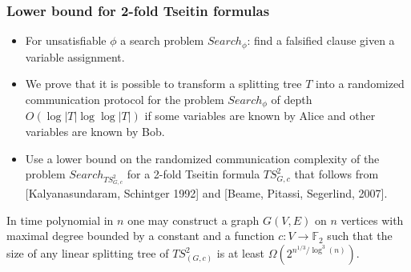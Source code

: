 \begin{frame}
    \frametitle{Lower bound for 2-fold Tseitin formulas}

    \begin{itemize}
		\item For unsatisfiable $\phi$ a search problem $Search_\phi$: find a
		    falsified clause given a variable assignment.  
		\item We prove that it is possible to transform a splitting tree $T$ into a
		    randomized communication protocol for the problem $Search_\phi$ of depth
	        $O(\log |T| \log\log |T|)$ if some variables are known by Alice and other
	        variables are known by Bob.
		\item Use a lower bound on the randomized communication complexity of the
		    problem $Search_{TS^2_{G,c}}$ for a 2-fold Tseitin formula $TS^2_{G,c}$
            that follows from [Kalyanasundaram, Schintger 1992] and
            [Beame, Pitassi, Segerlind, 2007].
	\end{itemize}
	\pause
    \begin{theorem}
        In time polynomial in $n$ one may construct a graph $G(V, E)$ on $n$ vertices
        with maximal degree bounded by a constant and a function $c: V \to
        \mathbb{F}_2$ such that the size of any linear splitting tree of
        $TS^2_{(G,c)}$ is at least $\Omega\left(2^{n^{1 / 3} / \log^3(n)} \right)$.
    \end{theorem}
\end{frame}



